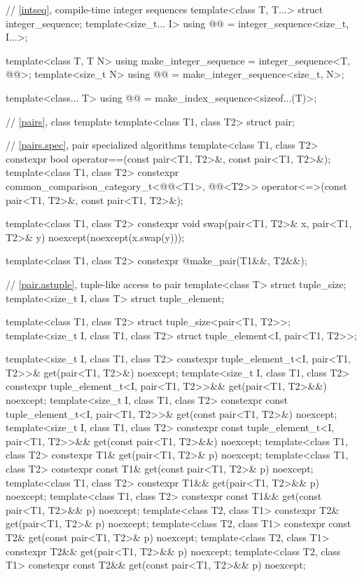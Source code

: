 \begin{codeblock}
{  // \ref{intseq}, compile-time integer sequences%
%
%
  template<class T, T...>
    struct integer_sequence;
  template<size_t... I>
    using @@ = integer_sequence<size_t, I...>;

  template<class T, T N>
    using make_integer_sequence = integer_sequence<T, @\seebelow{}@>;
  template<size_t N>
    using @@ = make_integer_sequence<size_t, N>;

  template<class... T>
    using @@ = make_index_sequence<sizeof...(T)>;

  // \ref{pairs}, class template 
  template<class T1, class T2>
    struct pair;

  // \ref{pairs.spec}, pair specialized algorithms
  template<class T1, class T2>
    constexpr bool operator==(const pair<T1, T2>&, const pair<T1, T2>&);
  template<class T1, class T2>
    constexpr common_comparison_category_t<@@<T1>,
                                           @@<T2>>
      operator<=>(const pair<T1, T2>&, const pair<T1, T2>&);

  template<class T1, class T2>
    constexpr void swap(pair<T1, T2>& x, pair<T1, T2>& y) noexcept(noexcept(x.swap(y)));

  template<class T1, class T2>
    constexpr @\seebelow@ make_pair(T1&&, T2&&);

  // \ref{pair.astuple}, tuple-like access to pair
  template<class T> struct tuple_size;
  template<size_t I, class T> struct tuple_element;

  template<class T1, class T2> struct tuple_size<pair<T1, T2>>;
  template<size_t I, class T1, class T2> struct tuple_element<I, pair<T1, T2>>;

  template<size_t I, class T1, class T2>
    constexpr tuple_element_t<I, pair<T1, T2>>& get(pair<T1, T2>&) noexcept;
  template<size_t I, class T1, class T2>
    constexpr tuple_element_t<I, pair<T1, T2>>&& get(pair<T1, T2>&&) noexcept;
  template<size_t I, class T1, class T2>
    constexpr const tuple_element_t<I, pair<T1, T2>>& get(const pair<T1, T2>&) noexcept;
  template<size_t I, class T1, class T2>
    constexpr const tuple_element_t<I, pair<T1, T2>>&& get(const pair<T1, T2>&&) noexcept;
  template<class T1, class T2>
    constexpr T1& get(pair<T1, T2>& p) noexcept;
  template<class T1, class T2>
    constexpr const T1& get(const pair<T1, T2>& p) noexcept;
  template<class T1, class T2>
    constexpr T1&& get(pair<T1, T2>&& p) noexcept;
  template<class T1, class T2>
    constexpr const T1&& get(const pair<T1, T2>&& p) noexcept;
  template<class T2, class T1>
    constexpr T2& get(pair<T1, T2>& p) noexcept;
  template<class T2, class T1>
    constexpr const T2& get(const pair<T1, T2>& p) noexcept;
  template<class T2, class T1>
    constexpr T2&& get(pair<T1, T2>&& p) noexcept;
  template<class T2, class T1>
    constexpr const T2&& get(const pair<T1, T2>&& p) noexcept;

}
\end{codeblock}
